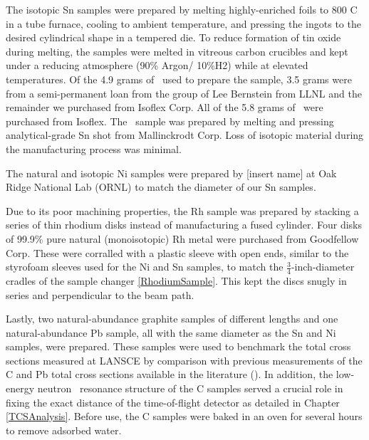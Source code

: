 The isotopic Sn samples were prepared by melting highly-enriched foils to
800 C in a tube furnace, cooling to ambient temperature, and pressing the ingots
to the desired cylindrical shape in a tempered die. To reduce formation of tin
oxide during melting, the samples were melted in vitreous carbon crucibles
and kept under a reducing atmosphere (90\% Argon/ 10\%H2) while at elevated
temperatures. Of the 4.9 grams of \snTwelve\ used to prepare the sample,
3.5 grams were from a semi-permanent loan from the group of Lee Bernstein from LLNL
and the remainder we purchased from Isoflex Corp. All of the 5.8 grams of \snFour\
were purchased from Isoflex. The \snNat\ sample was prepared by melting and
pressing analytical-grade Sn shot from Mallinckrodt Corp. Loss of isotopic
material during the manufacturing process was minimal.

The natural and isotopic Ni samples were prepared by [insert name] at Oak Ridge
National Lab (ORNL) to match the diameter of our Sn samples.

Due to its poor machining properties, the Rh sample was prepared by
stacking a series of thin rhodium disks instead of manufacturing a
fused cylinder. Four disks of 99.9\% pure natural (monoisotopic) Rh metal were purchased from
Goodfellow Corp. These were corralled with a
plastic sleeve with open ends, similar to the styrofoam sleeves used for the Ni
and Sn samples, to match the $\frac{3}{4}$-inch-diameter cradles of the sample changer
\ref{RhodiumSample}.
This kept the discs snugly in series and perpendicular to the beam path.

Lastly, two natural-abundance graphite samples of different lengths and one
natural-abundance Pb sample, all with the same diameter as the Sn and Ni samples, were
prepared. These samples were used to benchmark the total cross sections
measured at LANSCE by comparison with previous measurements of the C and
Pb total cross sections available in the literature
(\cite{Finlay1993,Abfalterer2001}). In addition, the low-energy neutron \tot\ resonance
structure of the C samples served a crucial role in fixing the exact distance
of the time-of-flight detector as detailed in Chapter \ref{TCSAnalysis}.
Before use, the C samples were baked in an oven for several
hours to remove adsorbed water.

